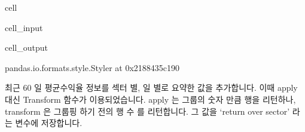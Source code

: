 \documentclass[letterpaper,10pt,english]{jupyterBook}
\begin{document}
\begin{sphinxuseclass}{cell}\begin{sphinxVerbatimInput}

\begin{sphinxuseclass}{cell_input}
\begin{sphinxVerbatim}[commandchars=\\\{\}]
   
\end{sphinxVerbatim}

\end{sphinxuseclass}\end{sphinxVerbatimInput}
\begin{sphinxVerbatimOutput}

\begin{sphinxuseclass}{cell_output}
\begin{sphinxVerbatim}[commandchars=\\\{\}]
\PYGZlt{}pandas.io.formats.style.Styler at 0x2188435c190\PYGZgt{}
\end{sphinxVerbatim}

\end{sphinxuseclass}\end{sphinxVerbatimOutput}

\end{sphinxuseclass}
\sphinxAtStartPar
최근 60 일 평균수익율 정보를 섹터 별, 일 별로 요약한 값을 추가합니다. 이때 apply 대신 Transform 함수가 이용되었습니다. apply 는 그룹의 숫자 만큼 행을 리턴하나, transform 은 그룹핑 하기 전의 행 수 를 리턴합니다. 그 값을 ‘return over sector’ 라는 변수에 저장합니다.
\end{document}
